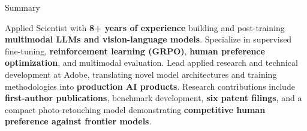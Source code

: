 \documentclass{resume}
\begin{document}
\enlargethispage{\baselineskip}


\begin{rSection}{Summary}
\raggedright
Applied Scientist with {\bf 8+ years of experience} building and \mbox{post-training} {\bf multimodal LLMs and \mbox{vision-language} models}. Specialize in supervised \mbox{fine-tuning}, {\bf reinforcement learning (GRPO)}, {\bf human preference optimization}, and multimodal evaluation. Lead applied research and technical development at Adobe, translating novel model architectures and training methodologies into {\bf production AI products}. Research contributions include {\bf \mbox{first-author} publications}, benchmark development, {\bf six patent filings}, and a compact \mbox{photo-retouching} model demonstrating {\bf competitive human preference against frontier models}.
\end{rSection}

\end{document}

